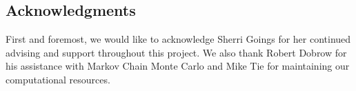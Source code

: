 \documentclass[10pt,twocolumn]{article}
\begin{document}
\subsection*{Acknowledgments}

First and foremost, we would like to acknowledge Sherri Goings for her continued advising and support throughout this project. We also thank Robert Dobrow for his assistance with Markov Chain Monte Carlo and Mike Tie for maintaining our computational resources.



\end{document}

